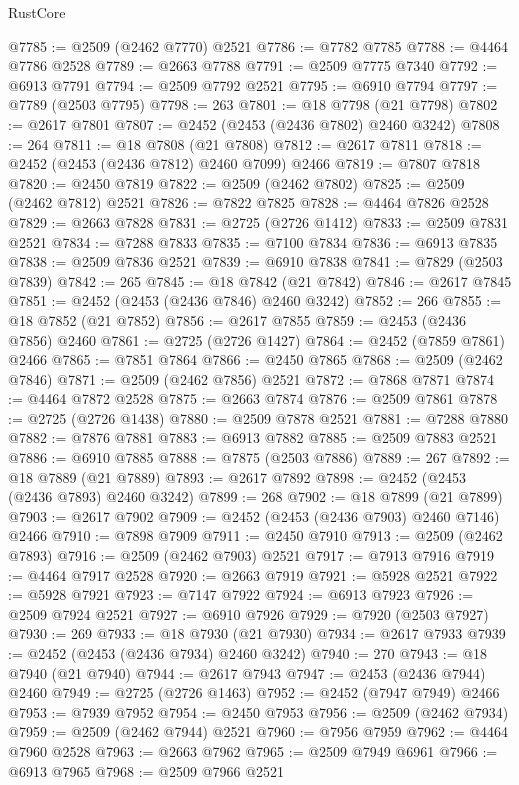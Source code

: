 \begin{lexlean}{RustCore}
\begin{coremodule}
@7785 := @2509 (@2462 @7770) @2521
@7786 := @7782 @7785
@7788 := @4464 @7786 @2528
@7789 := @2663 @7788
@7791 := @2509 @7775 @7340
@7792 := @6913 @7791
@7794 := @2509 @7792 @2521
@7795 := @6910 @7794
@7797 := @7789 (@2503 @7795)
@7798 := 263
@7801 := @18 @7798 (@21 @7798)
@7802 := @2617 @7801
@7807 := @2452 (@2453 (@2436 @7802) @2460 @3242)
@7808 := 264
@7811 := @18 @7808 (@21 @7808)
@7812 := @2617 @7811
@7818 := @2452 (@2453 (@2436 @7812) @2460 @7099) @2466
@7819 := @7807 @7818
@7820 := @2450 @7819
@7822 := @2509 (@2462 @7802)
@7825 := @2509 (@2462 @7812) @2521
@7826 := @7822 @7825
@7828 := @4464 @7826 @2528
@7829 := @2663 @7828
@7831 := @2725 (@2726 @1412)
@7833 := @2509 @7831 @2521
@7834 := @7288 @7833
@7835 := @7100 @7834
@7836 := @6913 @7835
@7838 := @2509 @7836 @2521
@7839 := @6910 @7838
@7841 := @7829 (@2503 @7839)
@7842 := 265
@7845 := @18 @7842 (@21 @7842)
@7846 := @2617 @7845
@7851 := @2452 (@2453 (@2436 @7846) @2460 @3242)
@7852 := 266
@7855 := @18 @7852 (@21 @7852)
@7856 := @2617 @7855
@7859 := @2453 (@2436 @7856) @2460
@7861 := @2725 (@2726 @1427)
@7864 := @2452 (@7859 @7861) @2466
@7865 := @7851 @7864
@7866 := @2450 @7865
@7868 := @2509 (@2462 @7846)
@7871 := @2509 (@2462 @7856) @2521
@7872 := @7868 @7871
@7874 := @4464 @7872 @2528
@7875 := @2663 @7874
@7876 := @2509 @7861
@7878 := @2725 (@2726 @1438)
@7880 := @2509 @7878 @2521
@7881 := @7288 @7880
@7882 := @7876 @7881
@7883 := @6913 @7882
@7885 := @2509 @7883 @2521
@7886 := @6910 @7885
@7888 := @7875 (@2503 @7886)
@7889 := 267
@7892 := @18 @7889 (@21 @7889)
@7893 := @2617 @7892
@7898 := @2452 (@2453 (@2436 @7893) @2460 @3242)
@7899 := 268
@7902 := @18 @7899 (@21 @7899)
@7903 := @2617 @7902
@7909 := @2452 (@2453 (@2436 @7903) @2460 @7146) @2466
@7910 := @7898 @7909
@7911 := @2450 @7910
@7913 := @2509 (@2462 @7893)
@7916 := @2509 (@2462 @7903) @2521
@7917 := @7913 @7916
@7919 := @4464 @7917 @2528
@7920 := @2663 @7919
@7921 := @5928 @2521
@7922 := @5928 @7921
@7923 := @7147 @7922
@7924 := @6913 @7923
@7926 := @2509 @7924 @2521
@7927 := @6910 @7926
@7929 := @7920 (@2503 @7927)
@7930 := 269
@7933 := @18 @7930 (@21 @7930)
@7934 := @2617 @7933
@7939 := @2452 (@2453 (@2436 @7934) @2460 @3242)
@7940 := 270
@7943 := @18 @7940 (@21 @7940)
@7944 := @2617 @7943
@7947 := @2453 (@2436 @7944) @2460
@7949 := @2725 (@2726 @1463)
@7952 := @2452 (@7947 @7949) @2466
@7953 := @7939 @7952
@7954 := @2450 @7953
@7956 := @2509 (@2462 @7934)
@7959 := @2509 (@2462 @7944) @2521
@7960 := @7956 @7959
@7962 := @4464 @7960 @2528
@7963 := @2663 @7962
@7965 := @2509 @7949 @6961
@7966 := @6913 @7965
@7968 := @2509 @7966 @2521

\end{coremodule}
\end{lexlean}
